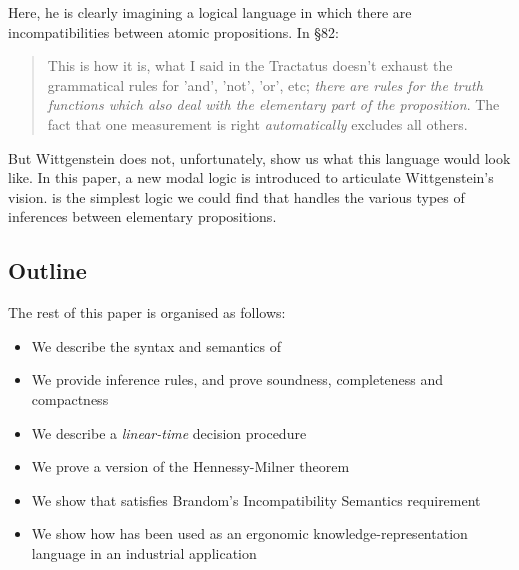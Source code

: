 \NI Here, he is clearly imagining a logical language in which there
are incompatibilities between atomic propositions. In \S 82:

\begin{quote}
  This is how it is, what I said in the Tractatus doesn't exhaust the
  grammatical rules for 'and', 'not', 'or', etc; \emph{there are rules
    for the truth functions which also deal with the elementary part
    of the proposition}.  The fact that one measurement is right
  \emph{automatically} excludes all others.
\end{quote}

\NI But Wittgenstein does not, unfortunately, show us what this
language would look like.  In this paper, a new modal logic is
introduced to articulate Wittgenstein's vision.  \ELFULL{} is the simplest logic we could find that handles the various types of inferences between elementary propositions.

\subsection{Outline}
The rest of this paper is organised as follows:
\begin{itemize}
\item
We describe the syntax and semantics of \ELFULL{}
\item
We provide inference rules, and prove soundness, completeness and compactness
\item
We describe a \emph{linear-time} decision procedure
\item
We prove a version of the Hennessy-Milner theorem
\item
We show that \ELFULL{} satisfies Brandom's Incompatibility Semantics requirement
\item
We show how \ELFULL{} has been used as an ergonomic knowledge-representation language in an industrial application
\end{itemize}

